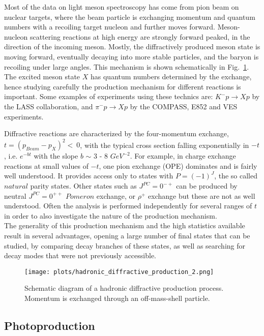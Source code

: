  Most of the data on light meson spectroscopy has come from pion beam on nuclear targets, where the beam particle is exchanging momentum and quantum numbers with a recoiling target nucleon and further moves forward. Meson-nucleon scattering reactions at high energy are strongly forward peaked, in the direction of the incoming meson. Mostly, the diffractively produced meson state is moving forward, eventually decaying into more stable particles, and the baryon is recoiling under large angles. This mechanism is shown schematically in Fig.~\ref{fig.1.3.2}. The excited meson state $X$ has quantum numbers determined by the exchange, hence studying carefully the production mechanism for different reactions is important. Some examples of experiments using these technics are: $K^{-}p \rightarrow Xp$ by the LASS collaboration, and $\pi^{-}p \rightarrow Xp$ by the COMPASS, E852 and VES experiments.
 ~\par Diffractive reactions are characterized by the four-momentum exchange, $t = (p_{Beam}-p_{X})^{2}<~0$, with the typical cross section falling exponentially in $-t$, i.e. $e^{-bt}$ with the slope $b$ $\sim$ 3 - 8 $GeV^{-2}$. For example, in charge exchange reactions at small values of $-t$, one pion exchange (OPE) dominates and is fairly well understood. It provides access only to states with $P = (-1)^{J}$, the so called $natural$ parity states. Other states such as $J^{PC} = 0^{-+}$ can be produced by neutral $J^{PC} = 0^{++}$ $Pomeron$ exchange, or $\rho^{+}$ exchange but these are not as well understood. Often the analysis is performed independently for several ranges of $t$ in order to also investigate the nature of the production mechanism.\\
The generality of this production mechanism and the high statistics available result in several advantages, opening a large number of final states that can be studied, by comparing decay branches of these states, as well as searching for decay modes that were not previously accessible.

\begin{figure}[H]
    \centering
        \texttt{[image: plots/hadronic\_diffractive\_production\_2.png]}
        \vspace*{7mm}
        \caption{Schematic diagram of a hadronic diffractive production process. Momentum is exchanged through an off-mass-shell particle.}
        \label{fig.1.3.2}
\end{figure}

 \subsection{Photoproduction}

